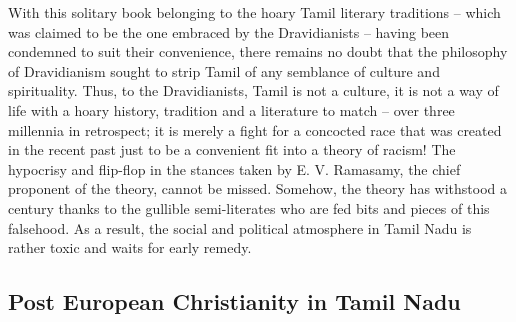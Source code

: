 With this solitary book belonging to the hoary Tamil literary traditions – which was claimed to be the one embraced by the Dravidianists – having been condemned to suit their convenience, there remains no doubt that the philosophy of Dravidianism sought to strip Tamil of any semblance of culture and spirituality. Thus, to the Dravidianists, Tamil is not a culture, it is not a way of life with a hoary history, tradition and a literature to match – over three millennia in retrospect; it is merely a fight for a concocted race that was created in the recent past just to be a convenient fit into a theory of racism! The hypocrisy and flip-flop in the stances taken by E. V. Ramasamy, the chief proponent of the theory, cannot be missed. Somehow, the theory has withstood a century thanks to the gullible semi-literates who are fed bits and pieces of this falsehood. As a result, the social and political atmosphere in Tamil Nadu is rather toxic and waits for early remedy.


\subsection*{Post European Christianity in Tamil Nadu}

